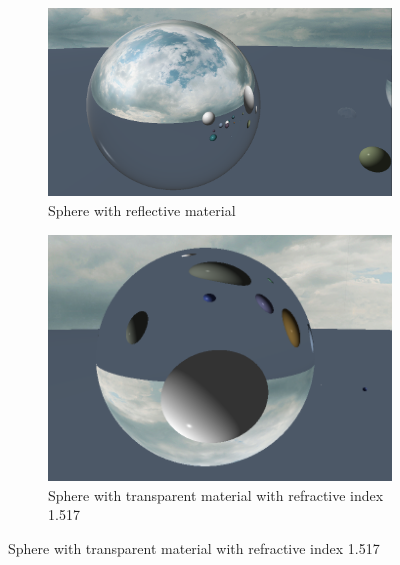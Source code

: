 \documentclass[final]{cmpreport}
\begin{document}
\begin{figure}
    \centering
    \begin{subfigure}{0.5\textwidth}
        \centering
        \includegraphics[width=0.9\linewidth]{img/reflection.png}
        \caption{Sphere with reflective material}
        \label{sphere_reflect}
    \end{subfigure}%
    \begin{subfigure}{0.5\textwidth}
        \centering
        \includegraphics[width=0.9\linewidth]{img/refraction_solid.png}
        \caption{Sphere with transparent material with refractive index 1.517}
        \label{sphere_refract_solid}
    \end{subfigure}
\end{figure}
\end{document}
